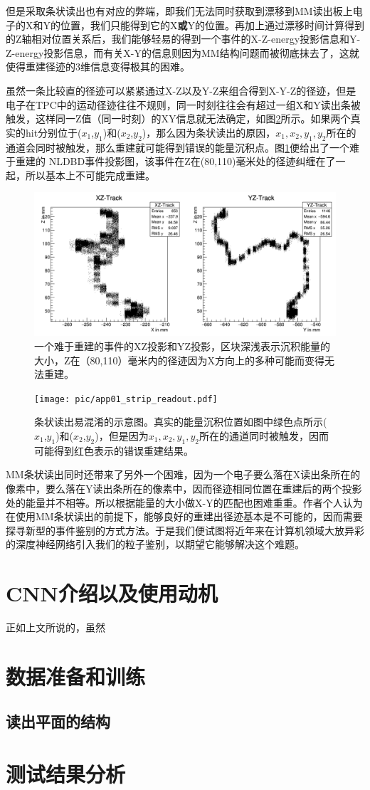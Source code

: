 但是采取条状读出也有对应的弊端，即我们无法同时获取到漂移到MM读出板上电子的X和Y的位置，我们只能得到它的X\textbf{或}Y的位置。再加上通过漂移时间计算得到的Z轴相对位置关系后，我们能够轻易的得到一个事件的X-Z-energy投影信息和Y-Z-energy投影信息，而有关X-Y的信息则因为MM结构问题而被彻底抹去了，这就使得重建径迹的3维信息变得极其的困难。

虽然一条比较直的径迹可以紧紧通过X-Z以及Y-Z来组合得到X-Y-Z的径迹，但是电子在TPC中的运动径迹往往不规则，同一时刻往往会有超过一组X和Y读出条被触发，这样同一Z值（同一时刻）的XY信息就无法确定，如图\ref{fig:difficulty_track_2}所示。如果两个真实的hit分别位于($x_1$,$y_1$)和($x_2$,$y_2$)，那么因为条状读出的原因，$x_1,x_2,y_1,y_2$所在的通道会同时被触发，那么重建就可能得到错误的能量沉积点。图\ref{fig:difficulty_track}便给出了一个难于重建的
NLDBD事件投影图，该事件在Z在(80,110)毫米处的径迹纠缠在了一起，所以基本上不可能完成重建。

\begin{figure}
    \centering
    \includegraphics[width=0.7\columnwidth]{pic/difficulty_track.png}
    \caption{一个难于重建的事件的XZ投影和YZ投影，区块深浅表示沉积能量的大小，Z在（80,110）毫米内的径迹因为X方向上的多种可能而变得无法重建。}
    \label{fig:difficulty_track}
\end{figure}

\begin{figure}
    \centering
    \texttt{[image: pic/app01\_strip\_readout.pdf]}
    \caption{条状读出易混淆的示意图。真实的能量沉积位置如图中绿色点所示($x_1$,$y_1$)和($x_2$,$y_2$)，但是因为$x_1,x_2,y_1,y_2$所在的通道同时被触发，因而可能得到红色表示的错误重建结果。}
    \label{fig:difficulty_track_2}
\end{figure}

MM条状读出同时还带来了另外一个困难，因为一个电子要么落在X读出条所在的像素中，要么落在Y读出条所在的像素中，因而径迹相同位置在重建后的两个投影处的能量并不相等。所以根据能量的大小做X-Y的匹配也困难重重。作者个人认为在使用MM条状读出的前提下，能够良好的重建出径迹基本是不可能的，因而需要探寻新型的事件鉴别的方式方法。于是我们便试图将近年来在计算机领域大放异彩的深度神经网络引入我们的粒子鉴别，以期望它能够解决这个难题。

\section{CNN介绍以及使用动机}

正如上文所说的，虽然

\section{数据准备和训练}

\subsection{读出平面的结构}


\section{测试结果分析}
